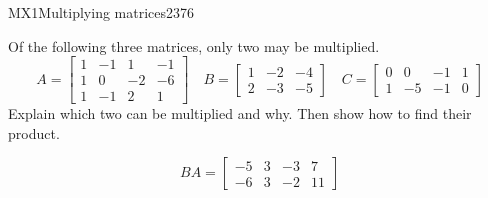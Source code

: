 \begin{exercise}{MX1}{Multiplying matrices}{2376} 
\begin{exerciseStatement} 

Of the following three matrices, only two may be multiplied. \[
          A=\left[\begin{array}{cccc}
1 & -1 & 1 & -1 \\
1 & 0 & -2 & -6 \\
1 & -1 & 2 & 1
\end{array}\right] \hspace{1em} B=\left[\begin{array}{ccc}
1 & -2 & -4 \\
2 & -3 & -5
\end{array}\right] \hspace{1em} C=\left[\begin{array}{cccc}
0 & 0 & -1 & 1 \\
1 & -5 & -1 & 0
\end{array}\right]
      \] Explain which two can be multiplied and why. Then show how to find their product.

 \end{exerciseStatement}
 \begin{exerciseAnswer} \[BA=\left[\begin{array}{cccc}
-5 & 3 & -3 & 7 \\
-6 & 3 & -2 & 11
\end{array}\right]\] \end{exerciseAnswer}
 \end{exercise}



